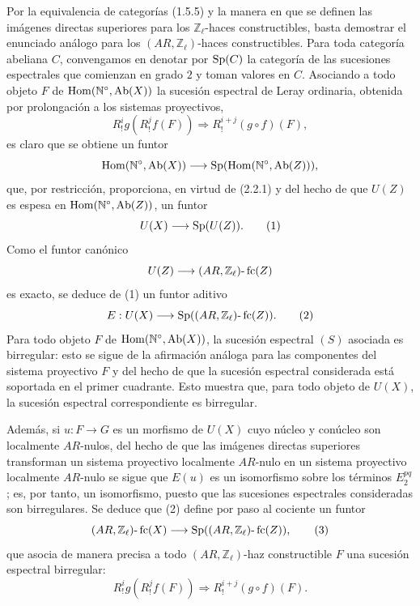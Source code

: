 \begin{prooftext}[Demostración]
Por la equivalencia de categorías (1.5.5) y la manera en que se definen las imágenes directas superiores para los \(\mathbb Z_\ell\)-haces constructibles, basta demostrar el enunciado análogo para los \((AR,\mathbb Z_\ell)\)-haces constructibles. Para toda categoría abeliana \(C\), convengamos en denotar por \(\operatorname{Sp}(C)\) la categoría de las sucesiones espectrales que comienzan en grado \(2\) y toman valores en \(C\). Asociando a todo objeto \(F\) de \(\operatorname{Hom}(\mathbb N^\circ,\operatorname{Ab}(X))\) la sucesión espectral de Leray ordinaria, obtenida por prolongación a los sistemas proyectivos,
\[
R^i_! g(R^j_! f(F))\Longrightarrow R^{i+j}_!(g\circ f)(F),
\tag{S}
\]
es claro que se obtiene un funtor
\[
\operatorname{Hom}(\mathbb N^\circ,\operatorname{Ab}(X))\longrightarrow \operatorname{Sp}(\operatorname{Hom}(\mathbb N^\circ,\operatorname{Ab}(Z))),
\]
que, por restricción, proporciona, en virtud de (2.2.1) y del hecho de que \(U(Z)\) es espesa en \(\operatorname{Hom}(\mathbb N^\circ,\operatorname{Ab}(Z))\), un funtor
\[
U(X)\longrightarrow \operatorname{Sp}(U(Z)).
\tag{1}
\]
Como el funtor canónico
\[
U(Z)\longrightarrow (AR,\mathbb Z_\ell)\text{-}\operatorname{fc}(Z)
\]
es exacto, se deduce de (1) un funtor aditivo
\[
E:U(X)\longrightarrow \operatorname{Sp}((AR,\mathbb Z_\ell)\text{-}\operatorname{fc}(Z)).
\tag{2}
\]
Para todo objeto \(F\) de \(\operatorname{Hom}(\mathbb N^\circ,\operatorname{Ab}(X))\), la sucesión espectral \((S)\) asociada es birregular: esto se sigue de la afirmación análoga para las componentes del sistema proyectivo \(F\) y del hecho de que la sucesión espectral considerada está soportada en el primer cuadrante. Esto muestra que, para todo objeto de \(U(X)\), la sucesión espectral correspondiente es birregular.

Además, si \(u:F\to G\) es un morfismo de \(U(X)\) cuyo núcleo y conúcleo son localmente \(AR\)-nulos, del hecho de que las imágenes directas superiores transforman un sistema proyectivo localmente \(AR\)-nulo en un sistema proyectivo localmente \(AR\)-nulo se sigue que \(E(u)\) es un isomorfismo sobre los términos \(E_2^{pq}\); es, por tanto, un isomorfismo, puesto que las sucesiones espectrales consideradas son birregulares. Se deduce que (2) define por paso al cociente un funtor
\[
(AR,\mathbb Z_\ell)\text{-}\operatorname{fc}(X)
\longrightarrow \operatorname{Sp}((AR,\mathbb Z_\ell)\text{-}\operatorname{fc}(Z)),
\tag{3}
\]
que asocia de manera precisa a todo \((AR,\mathbb Z_\ell)\)-haz constructible \(F\) una sucesión espectral birregular:
\[
R^i_!g(R^j_!f(F))\Longrightarrow R^{i+j}_!(g\circ f)(F).
\]
\end{prooftext}
